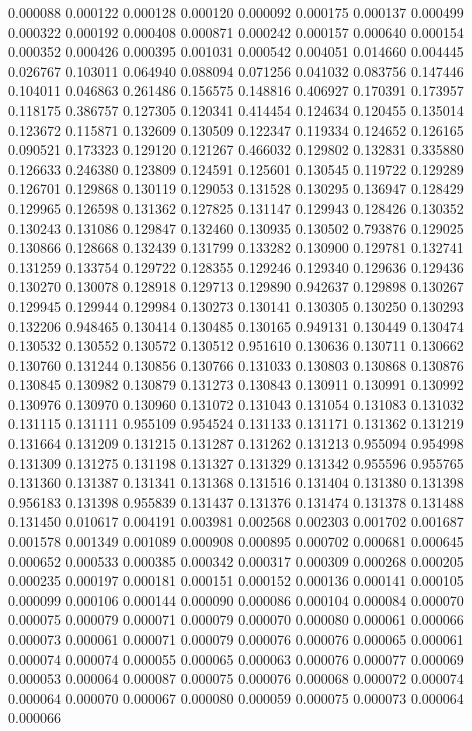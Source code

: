 0.000088
0.000122
0.000128
0.000120
0.000092
0.000175
0.000137
0.000499
0.000322
0.000192
0.000408
0.000871
0.000242
0.000157
0.000640
0.000154
0.000352
0.000426
0.000395
0.001031
0.000542
0.004051
0.014660
0.004445
0.026767
0.103011
0.064940
0.088094
0.071256
0.041032
0.083756
0.147446
0.104011
0.046863
0.261486
0.156575
0.148816
0.406927
0.170391
0.173957
0.118175
0.386757
0.127305
0.120341
0.414454
0.124634
0.120455
0.135014
0.123672
0.115871
0.132609
0.130509
0.122347
0.119334
0.124652
0.126165
0.090521
0.173323
0.129120
0.121267
0.466032
0.129802
0.132831
0.335880
0.126633
0.246380
0.123809
0.124591
0.125601
0.130545
0.119722
0.129289
0.126701
0.129868
0.130119
0.129053
0.131528
0.130295
0.136947
0.128429
0.129965
0.126598
0.131362
0.127825
0.131147
0.129943
0.128426
0.130352
0.130243
0.131086
0.129847
0.132460
0.130935
0.130502
0.793876
0.129025
0.130866
0.128668
0.132439
0.131799
0.133282
0.130900
0.129781
0.132741
0.131259
0.133754
0.129722
0.128355
0.129246
0.129340
0.129636
0.129436
0.130270
0.130078
0.128918
0.129713
0.129890
0.942637
0.129898
0.130267
0.129945
0.129944
0.129984
0.130273
0.130141
0.130305
0.130250
0.130293
0.132206
0.948465
0.130414
0.130485
0.130165
0.949131
0.130449
0.130474
0.130532
0.130552
0.130572
0.130512
0.951610
0.130636
0.130711
0.130662
0.130760
0.131244
0.130856
0.130766
0.131033
0.130803
0.130868
0.130876
0.130845
0.130982
0.130879
0.131273
0.130843
0.130911
0.130991
0.130992
0.130976
0.130970
0.130960
0.131072
0.131043
0.131054
0.131083
0.131032
0.131115
0.131111
0.955109
0.954524
0.131133
0.131171
0.131362
0.131219
0.131664
0.131209
0.131215
0.131287
0.131262
0.131213
0.955094
0.954998
0.131309
0.131275
0.131198
0.131327
0.131329
0.131342
0.955596
0.955765
0.131360
0.131387
0.131341
0.131368
0.131516
0.131404
0.131380
0.131398
0.956183
0.131398
0.955839
0.131437
0.131376
0.131474
0.131378
0.131488
0.131450
0.010617
0.004191
0.003981
0.002568
0.002303
0.001702
0.001687
0.001578
0.001349
0.001089
0.000908
0.000895
0.000702
0.000681
0.000645
0.000652
0.000533
0.000385
0.000342
0.000317
0.000309
0.000268
0.000205
0.000235
0.000197
0.000181
0.000151
0.000152
0.000136
0.000141
0.000105
0.000099
0.000106
0.000144
0.000090
0.000086
0.000104
0.000084
0.000070
0.000075
0.000079
0.000071
0.000079
0.000070
0.000080
0.000061
0.000066
0.000073
0.000061
0.000071
0.000079
0.000076
0.000076
0.000065
0.000061
0.000074
0.000074
0.000055
0.000065
0.000063
0.000076
0.000077
0.000069
0.000053
0.000064
0.000087
0.000075
0.000076
0.000068
0.000072
0.000074
0.000064
0.000070
0.000067
0.000080
0.000059
0.000075
0.000073
0.000064
0.000066
